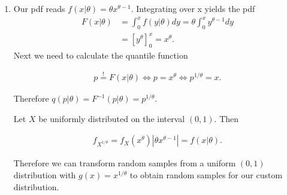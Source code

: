 \begin{solution}

  \phantom{}

  \begin{enumerate}[label = (\alph*)]
    \item
    Our pdf reads $f(x|\theta) = \theta x^{\theta - 1}$. Integrating over x yields the pdf
    \begin{align*}
      F(x|\theta) &= \int_0^x f(y|\theta) dy = \theta \int_0^x y^{\theta - 1} dy \\
      &=  [y^{\theta}]_0^{x} = x^{\theta}.
    \end{align*}
    Next we need to calculate the quantile function

    \begin{align*}
      p \stackrel{!}{=} F(x|\theta) \iff
      p = x^{\theta} \iff
      p^{1/\theta} = x.
    \end{align*}

    Therefore $q(p|\theta) = F^{-1}(p|\theta) = p^{1/\theta}$.

    Let $X$ be uniformly distributed on the interval $(0,1)$. Then

    \begin{align*}
      f_{X^{1/\theta}} = f_X(x^{\theta})|\theta x^{\theta - 1}| = f(x|\theta).
    \end{align*}

    Therefore we can transform random samples from a uniform $(0,1)$ distribution
    with $g(x) = x^{1/\theta}$ to obtain random samples for our custom distribution.
  \end{enumerate}

\end{solution}


